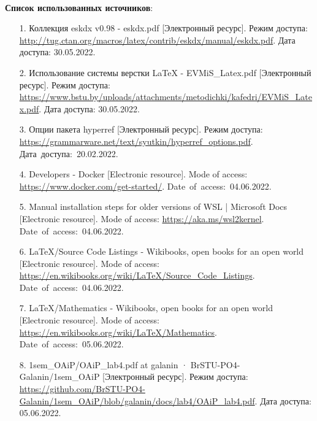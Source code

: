 \documentclass[12pt, a4paper, simple]{eskdtext}
\begin{document}
\paragraph{} \textbf{Список использованных источников}:
\begin{enumerate}
    \item[1.] Коллекция eskdx v0.98 - eskdx.pdf
    [Электронный ресурс].
    Режим доступа: \url{http://tug.ctan.org/macros/latex/contrib/eskdx/manual/eskdx.pdf}.
    Дата доступа: 30.05.2022.

    \item[2.] Использование системы верстки LaTeX - EVMiS\_Latex.pdf
    [Электронный ресурс].
    Режим доступа: \url{https://www.bstu.by/uploads/attachments/metodichki/kafedri/EVMiS_Latex.pdf}.
    Дата доступа: 30.05.2022.

    \item[3.] Опции пакета hyperref
    [Электронный ресурс].
    Режим доступа: \url{https://grammarware.net/text/syutkin/hyperref_options.pdf}.
    Дата~доступа:~20.02.2022.

    \item[4.] Developers - Docker
    [Electronic resource].
    Mode of access: \url{https://www.docker.com/get-started/}.
    Date~of~access:~04.06.2022.

    \item[5.] Manual installation steps for older versions of WSL | Microsoft Docs
    [Electronic resource].
    Mode of access: \url{https://aka.ms/wsl2kernel}.
    Date~of~access:~04.06.2022.

    \item[6.] LaTeX/Source Code Listings - Wikibooks, open books for an open world
    [Electronic resource].
    Mode of access: \url{https://en.wikibooks.org/wiki/LaTeX/Source_Code_Listings}.
    Date~of~access:~04.06.2022.

    \item[7.] LaTeX/Mathematics - Wikibooks, open books for an open world
    [Electronic resource].
    Mode of access: \url{https://en.wikibooks.org/wiki/LaTeX/Mathematics}.
    Date~of~access:~05.06.2022.

    \item[8.] 1sem\_OAiP/OAiP\_lab4.pdf at galanin · BrSTU-PO4-Galanin/1sem\_OAiP
    [Электронный ресурс].
    Режим доступа: \url{https://github.com/BrSTU-PO4-Galanin/1sem_OAiP/blob/galanin/docs/lab4/OAiP_lab4.pdf}.
    Дата доступа: 05.06.2022.
\end{enumerate}

\newpage
\end{document}
